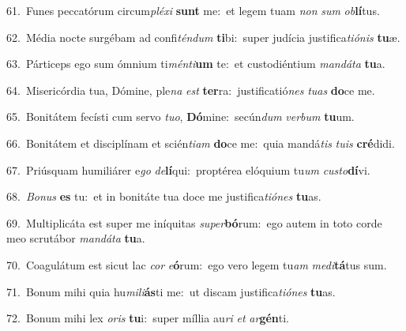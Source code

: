 {\numbfont\textcolor{\numbcolor}{61.}}~Funes peccatórum circum\-\textit{plé}\-\textit{xi} \textbf{sunt} me:~\star et legem tuam \textit{non} \textit{sum} \textit{ob}\-\textbf{lí}tus.\par
{\numbfont\textcolor{\numbcolor}{62.}}~Média nocte surgébam ad confi\-\textit{tén}\-\textit{dum} \textbf{ti}\-bi:~\star super judícia justifica\-\textit{ti}\-\textit{ó}\textit{nis} \textbf{tu}\-æ.\par
{\numbfont\textcolor{\numbcolor}{63.}}~Párticeps ego sum ómnium ti\-\textit{mén}\-\textit{ti}\textbf{um} te:~\star et custodiéntium \textit{man}\-\textit{dá}\textit{ta} \textbf{tu}\-a.\par
{\numbfont\textcolor{\numbcolor}{64.}}~Misericórdia tua, Dómine, ple\textit{na} \textit{est} \textbf{ter}\-ra:~\star justificatió\textit{nes} \textit{tu}\-\textit{as} \textbf{do}\-ce me.\par
{\numbfont\textcolor{\numbcolor}{65.}}~Bonitátem fecísti cum servo \textit{tu}\-\textit{o}, \textbf{Dó}\-mine:~\star secún\textit{dum} \textit{ver}\-\textit{bum} \textbf{tu}\-um.\par
{\numbfont\textcolor{\numbcolor}{66.}}~Bonitátem et disciplínam et scién\-\textit{ti}\-\textit{am} \textbf{do}\-ce me:~\star quia mandá\textit{tis} \textit{tu}\-\textit{is} \textbf{cré}\-didi.\par
{\numbfont\textcolor{\numbcolor}{67.}}~Priúsquam humiliárer e\textit{go} \textit{de}\-\textbf{lí}qui:~\star proptérea elóquium tu\textit{um} \textit{cus}\-\textit{to}\textbf{dí}vi.\par
{\numbfont\textcolor{\numbcolor}{68.}}~\-\textit{Bo}\-\textit{nus} \textbf{es} tu:~\star et in bonitáte tua doce me justifica\-\textit{ti}\-\textit{ó}\textit{nes} \textbf{tu}\-as.\par
{\numbfont\textcolor{\numbcolor}{69.}}~Multiplicáta est super me iníquitas \textit{su}\-\textit{per}\textbf{bó}rum:~\star ego autem in toto corde meo scrutábor \textit{man}\-\textit{dá}\textit{ta} \textbf{tu}\-a.\par
{\numbfont\textcolor{\numbcolor}{70.}}~Coagulátum est sicut lac \textit{cor} \textit{e}\-\textbf{ó}rum:~\star ego vero legem tu\textit{am} \textit{me}\-\textit{di}\textbf{tá}tus sum.\par
{\numbfont\textcolor{\numbcolor}{71.}}~Bonum mihi quia hu\-\textit{mi}\-\textit{li}\textbf{ás}ti me:~\star ut discam justifica\-\textit{ti}\-\textit{ó}\textit{nes} \textbf{tu}\-as.\par
{\numbfont\textcolor{\numbcolor}{72.}}~Bonum mihi lex \textit{o}\-\textit{ris} \textbf{tu}\-i:~\star super míllia au\textit{ri} \textit{et} \textit{ar}\-\textbf{gén}ti.\par
